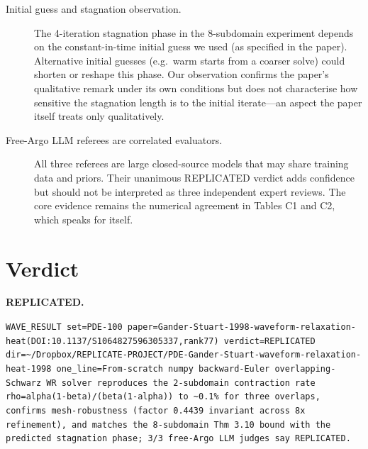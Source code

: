 \documentclass[11pt]{article}
\begin{document}
\begin{description}
\item[Initial guess and stagnation observation.]
The 4-iteration stagnation phase in the 8-subdomain experiment depends on the
constant-in-time initial guess we used (as specified in the paper). Alternative initial
guesses (e.g.\ warm starts from a coarser solve) could shorten or reshape this phase.
Our observation confirms the paper's qualitative remark under its own conditions but does
not characterise how sensitive the stagnation length is to the initial iterate---an aspect
the paper itself treats only qualitatively.

\item[Free-Argo LLM referees are correlated evaluators.]
All three referees are large closed-source models that may share training data and priors.
Their unanimous REPLICATED verdict adds confidence but should not be interpreted as three
independent expert reviews. The core evidence remains the numerical agreement in Tables C1
and C2, which speaks for itself.
\end{description}

\section*{Verdict}
\textbf{REPLICATED.}

\medskip
\noindent\texttt{WAVE\_RESULT set=PDE-100
paper=Gander-Stuart-1998-waveform-relaxation-heat(DOI:10.1137/S1064827596305337,rank77)
verdict=REPLICATED
dir=\textasciitilde/Dropbox/REPLICATE-PROJECT/PDE-Gander-Stuart-waveform-relaxation-heat-1998
one\_line=From-scratch numpy backward-Euler overlapping-Schwarz WR solver reproduces the
2-subdomain contraction rate rho=alpha(1-beta)/(beta(1-alpha)) to \textasciitilde 0.1\% for three overlaps,
confirms mesh-robustness (factor 0.4439 invariant across 8x refinement), and matches the
8-subdomain Thm 3.10 bound with the predicted stagnation phase; 3/3 free-Argo LLM judges
say REPLICATED.}
\end{document}
